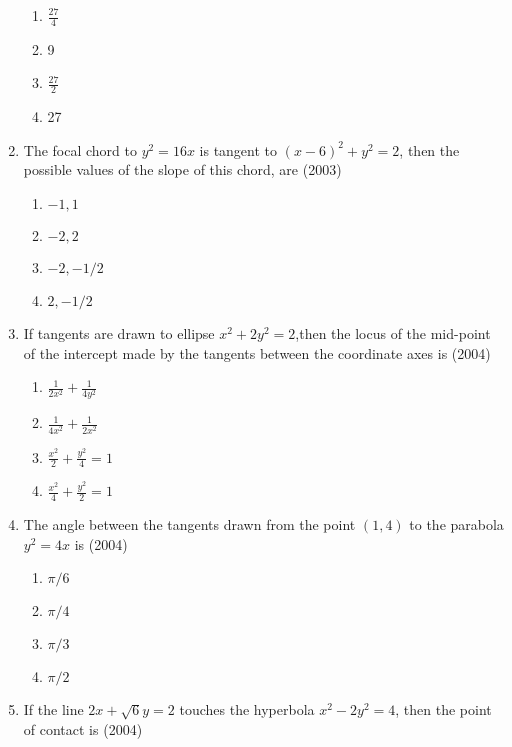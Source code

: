 \begin{enumerate}
\begin{multicols}{4}
\begin{enumerate}
	\item $\frac{27}{4}$ 
    \item 9 
    \item $\frac{27}{2}$ 
    \item 27 
 \end{enumerate}
\end{multicols}
\item The focal chord to $y^{2}=16x$ is tangent to $(x-6)^{2}+y^{2}=2$, then the possible values of the slope of this chord, are \hfill{(2003)}
\begin{multicols}{4}
\begin{enumerate}
    \item ${-1,1}$
    \item ${-2,2}$
    \item ${-2,-1/2}$
    \item ${2,-1/2}$
\end{enumerate}
\end{multicols}
\item If tangents are drawn to ellipse $x^{2}+2y^{2}=2$,then the locus of the mid-point of the intercept made by the tangents between the coordinate axes is 
\hfill{(2004)}
\begin{multicols}{4}
\begin{enumerate}
    \item $\frac{1}{2x^{2}}+\frac{1}{4y^{2}}$ 
    \item $\frac{1}{4x^{2}}+\frac{1}{2x^{2}}$ 
    \item $\frac{x^{2}}{2}+\frac{y^{2}}{4}=1$
    \item $\frac{x^{2}}{4}+\frac{y^{2}}{2}=1$ 
\end{enumerate}
\end{multicols}
\item The angle between the tangents drawn from the point ${(1,4)}$ to the parabola $y^{2}=4x$ is 
\hfill{(2004)}
\begin{multicols}{4}
\begin{enumerate}
    \item $\pi/6$ 
    \item $\pi/4$ 
    \item $\pi/3$
    \item $\pi/2$
\end{enumerate}
\end{multicols}
\item If the line $2x+\sqrt{6}y=2$ touches the hyperbola $x^{2}-2y^{2}=4$, then the point of contact is \hfill{(2004)}
\begin{multicols}{4}

\end{multicols}
\end{enumerate}
